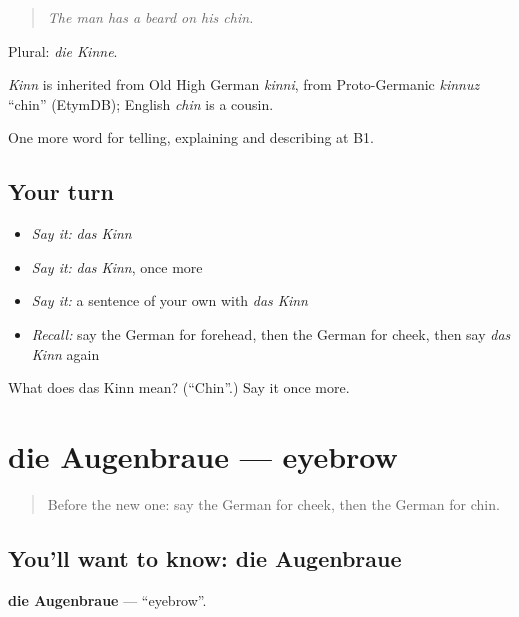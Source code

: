 \begin{quote}
\emph{The man has a beard on his chin.}
\end{quote}

Plural: \emph{die Kinne}.

\begin{cousinweb}
\emph{Kinn} is inherited from Old High German \emph{kinni}, from Proto-Germanic \emph{kinnuz} \textquotedblleft{}chin\textquotedblright{} (EtymDB); English \emph{chin} is a cousin.
\end{cousinweb}

\begin{grammarlens}[title={What you've built}]
One more word for telling, explaining and describing at B1.
\end{grammarlens}

\subsection*{Your turn}
\begin{itemize}
\raggedright
  \item \emph{Say it:} \emph{das Kinn}
  \item \emph{Say it:} \emph{das Kinn}, once more
  \item \emph{Say it:} a sentence of your own with \emph{das Kinn}
  \item \emph{Recall:} say the German for forehead, then the German for cheek, then say \emph{das Kinn} again
\end{itemize}

\begin{tcolorbox}[breakable,colback=teal!4,colframe=teal!35!black,title={Before you move on}]
What does das Kinn mean? (\textquotedblleft{}Chin\textquotedblright{}.) Say it once more.
\end{tcolorbox}
\section[die Augenbraue]{die Augenbraue — eyebrow}

\label{lesson:GE-C484-augenbraue}



\begin{quote}
Before the new one: say the German for cheek, then the German for chin.
\end{quote}

\subsection*{You'll want to know: die Augenbraue}
\textbf{die Augenbraue} — \textquotedblleft{}eyebrow\textquotedblright{}.

